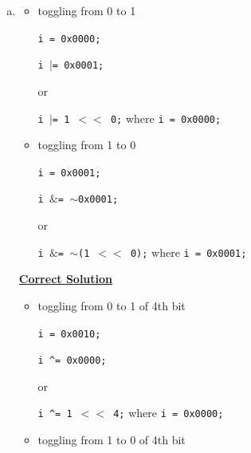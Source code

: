 \documentclass[12pt]{article}
\begin{document}
\begin{enumerate}[1.]
\begin{enumerate}[a)]
        \item

        \begin{itemize}
            \item toggling from 0 to 1

            \bigskip

            \texttt{i = 0x0000;}

            \texttt{i $\lvert$= 0x0001;}

            \bigskip

            or

            \bigskip

            \texttt{i $\lvert$= 1 $<<$ 0;} where \texttt{i = 0x0000;}

            \item toggling from 1 to 0

            \bigskip

            \texttt{i = 0x0001;}

            \texttt{i $\&$= $\sim$0x0001;}

            \bigskip

            or

            \bigskip

            \texttt{i $\&$= $\sim$(1 $<<$ 0);} where \texttt{i = 0x0001;}
        \end{itemize}

        \bigskip

        \begin{mdframed}
        \underline{\textbf{Correct Solution}}

        \begin{itemize}
            \item toggling from 0 to 1 of \color{red}4th bit\color{black}

            \bigskip

            \color{red}\texttt{i = 0x0010;}\color{black}

            \texttt{i \^{}= 0x0000;}

            \bigskip

            or

            \bigskip

            \texttt{i \^{}= 1 $<<$ 4;} where \texttt{i = 0x0000;}

            \item toggling from 1 to 0 of \color{red}4th bit\color{black}

            \bigskip


\end{itemize}
\end{mdframed}
\end{enumerate}
\end{enumerate}
\end{document}
